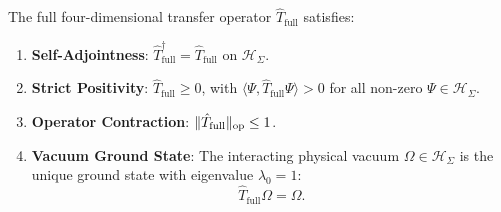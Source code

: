 \begin{proposition}
\label{prop:t_full_properties}
The full four-dimensional transfer operator $\hat{T}_{\mathrm{full}}$ satisfies:
\begin{enumerate}
    \item \textbf{Self-Adjointness}: $\hat{T}_{\mathrm{full}}^\dagger = \hat{T}_{\mathrm{full}}$ on $\mathcal{H}_\Sigma$.
    \item \textbf{Strict Positivity}: $\hat{T}_{\mathrm{full}} \ge 0$, with $\langle \Psi, \hat{T}_{\mathrm{full}} \Psi \rangle > 0$ for all non-zero $\Psi \in \mathcal{H}_\Sigma$.
    \item \textbf{Operator Contraction}: $\|\hat{T}_{\mathrm{full}}\|_{\mathrm{op}} \le 1$.
    \item \textbf{Vacuum Ground State}: The interacting physical vacuum $\Omega \in \mathcal{H}_\Sigma$ is the unique ground state with eigenvalue $\lambda_0 = 1$:
    \begin{equation}
    \hat{T}_{\mathrm{full}} \Omega = \Omega.
    \end{equation}
\end{enumerate}
\end{proposition}

